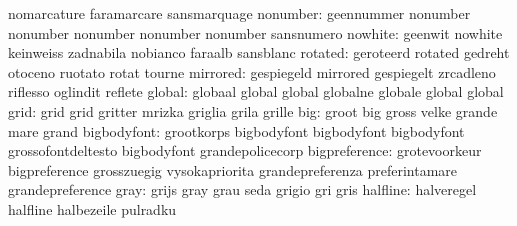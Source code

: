                            nomarcature               faramarcare
                           sansmarquage
                 nonumber: geennummer                nonumber
                           nonumber                  nonumber
                           nonumber                  nonumber
                           sansnumero
                  nowhite: geenwit                   nowhite
                           keinweiss                 zadnabila
                           nobianco                  faraalb
                           sansblanc
                  rotated: geroteerd                 rotated
                           gedreht                   otoceno
                           ruotato                   rotat
                           tourne
                 mirrored: gespiegeld                mirrored
                           gespiegelt                zrcadleno
                           riflesso                  oglindit
                           reflete
                   global: globaal                   global
                           global                    globalne
                           globale                   global
                           global
                     grid: grid                      grid
                           gritter                   mrizka
                           griglia                   grila
                           grille
                      big: groot                     big
                           gross                     velke
                           grande                    mare
                           grand
              bigbodyfont: grootkorps                bigbodyfont
                           bigbodyfont               bigbodyfont
                           grossofontdeltesto        bigbodyfont
                           grandepolicecorp
            bigpreference: grotevoorkeur             bigpreference
                           grosszuegig               vysokapriorita
                           grandepreferenza          preferintamare
                           grandepreference
                     gray: grijs                     gray
                           grau                      seda
                           grigio                    gri
                           gris
                 halfline: halveregel                halfline
                           halbezeile                pulradku
